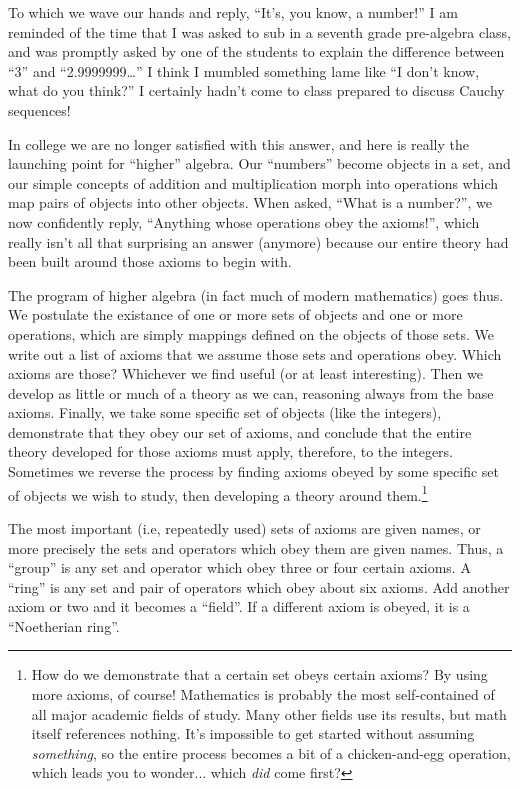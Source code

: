 To which we wave our hands and reply, ``It's, you know, a number!''
I am reminded of the time that I was asked to sub in a
seventh grade pre-algebra class, and was promptly asked by one of the
students to explain the difference between ``3'' and ``2.9999999\ldots''
I think I mumbled something lame like ``I don't know, what do you
think?'' I certainly hadn't come to class prepared to discuss Cauchy
sequences!

In college we are no longer satisfied with this answer, and here is
really the launching point for ``higher'' algebra.  Our ``numbers''
become objects in a set, and our simple concepts of addition and
multiplication morph into operations which map pairs of objects into
other objects.  When asked, ``What is a number?'', we now confidently
reply, ``Anything whose operations obey the axioms!'', which really
isn't all that surprising an answer (anymore) because our entire
theory had been built around those axioms to begin with.

The program of higher algebra (in fact much of modern mathematics)
goes thus.  We postulate the existance of one or more sets of objects
and one or more operations, which are simply mappings defined on the
objects of those sets.  We write out a list of axioms that we assume
those sets and operations obey.  Which axioms are those?  Whichever we
find useful (or at least interesting).  Then we develop as little or
much of a theory as we can, reasoning always from the base axioms.
Finally, we take some specific set of objects (like the integers),
demonstrate that they obey our set of axioms, and conclude that the
entire theory developed for those axioms must apply, therefore, to the
integers.  Sometimes we reverse the process by finding axioms obeyed
by some specific set of objects we wish to study, then developing a
theory around them.\footnote{How do we demonstrate that a certain set
obeys certain axioms?  By using more axioms, of course!  Mathematics
is probably the most self-contained of all major academic fields of study.
Many other fields use its results, but math itself references nothing.
It's impossible to get started without assuming {\it something}, so
the entire process becomes a bit of a chicken-and-egg operation, which
leads you to wonder$...$ which {\it did} come first?}

The most important (i.e, repeatedly used) sets of axioms are given
names, or more precisely the sets and operators which obey them are
given names.  Thus, a ``group'' is any set and operator which obey three
or four certain axioms.  A ``ring'' is any set and pair of operators
which obey about six axioms.  Add another axiom or two and it
becomes a ``field''.  If a different axiom is obeyed, it is a
``Noetherian ring''.

